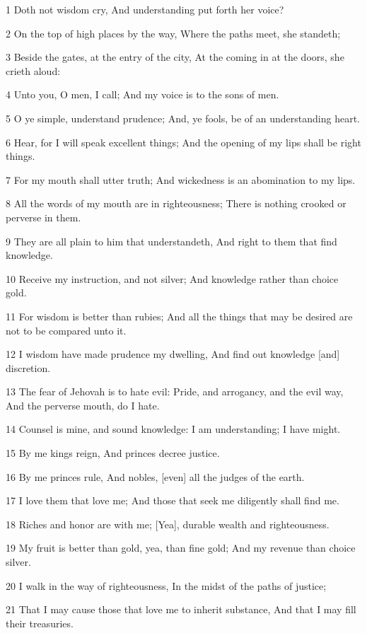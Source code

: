 \par 1 Doth not wisdom cry, And understanding put forth her voice?
\par 2 On the top of high places by the way, Where the paths meet, she standeth;
\par 3 Beside the gates, at the entry of the city, At the coming in at the doors, she crieth aloud:
\par 4 Unto you, O men, I call; And my voice is to the sons of men.
\par 5 O ye simple, understand prudence; And, ye fools, be of an understanding heart.
\par 6 Hear, for I will speak excellent things; And the opening of my lips shall be right things.
\par 7 For my mouth shall utter truth; And wickedness is an abomination to my lips.
\par 8 All the words of my mouth are in righteousness; There is nothing crooked or perverse in them.
\par 9 They are all plain to him that understandeth, And right to them that find knowledge.
\par 10 Receive my instruction, and not silver; And knowledge rather than choice gold.
\par 11 For wisdom is better than rubies; And all the things that may be desired are not to be compared unto it.
\par 12 I wisdom have made prudence my dwelling, And find out knowledge [and] discretion.
\par 13 The fear of Jehovah is to hate evil: Pride, and arrogancy, and the evil way, And the perverse mouth, do I hate.
\par 14 Counsel is mine, and sound knowledge: I am understanding; I have might.
\par 15 By me kings reign, And princes decree justice.
\par 16 By me princes rule, And nobles, [even] all the judges of the earth.
\par 17 I love them that love me; And those that seek me diligently shall find me.
\par 18 Riches and honor are with me; [Yea], durable wealth and righteousness.
\par 19 My fruit is better than gold, yea, than fine gold; And my revenue than choice silver.
\par 20 I walk in the way of righteousness, In the midst of the paths of justice;
\par 21 That I may cause those that love me to inherit substance, And that I may fill their treasuries.
